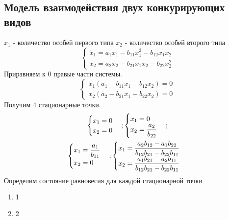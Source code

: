\subsection{Модель взаимодействия двух конкурирующих видов}
$x_1$ - количество особей первого типа
$x_2$ - количество особей второго типа
\begin{equation}
  \begin{cases}
    \dot{x}_1=a_1x_1-b_{11}x_1^2-b_{12}x_1x_2\\
    \dot{x}_2=a_2x_2-b_{21}x_1x_2-b_{22}x_2^2
  \end{cases}
\end{equation}
Приравняем к 0 правые части системы.
\begin{equation}
  \begin{cases}
    x_1(a_1-b_{11}x_1-b_{12}x_2)=0\\
    x_2(a_2-b_{21}x_1-b_{22}x_2)=0
  \end{cases}
\end{equation}
Получим 4 стационарные точки.
\begin{gather}
  \begin{cases}
    x_1=0\\
    x_2=0
  \end{cases};
  \begin{cases}
    x_1=0\\
    x_2=\dfrac{a_2}{b_{22}}
  \end{cases};\\
  \begin{cases}
    x_1=\dfrac{a_1}{b_{11}}\\
    x_2=0
  \end{cases};
  \begin{cases}
    x_1=\dfrac{a_2b_{12}-a_1b_{22}}{b_{12}b_{21}-b_{22}b_{11}}\\
    x_2=\dfrac{a_1b_{21}-a_2b_{11}}{b_{12}b_{21}-b_{22}b_{11}}
  \end{cases}\notag
\end{gather}
Определим состояние равновесия для каждой стационарной точки
\begin{enumerate}
  \item 1
  \item 2
\end{enumerate}
